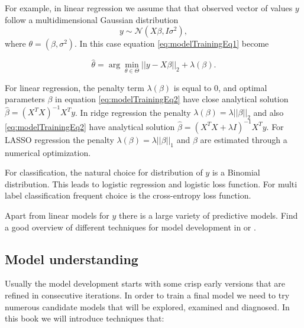 \documentclass[12pt,]{krantz}
\begin{document}
For example, in linear regression we assume that that observed vector of values \(y\) follow a multidimensional Gaussian distribution
\[
y \sim \mathcal N(X \beta, I\sigma^2),
\]
where \(\theta = (\beta, \sigma^2)\). In this case equation \eqref{eq:modelTrainingEq1} become

\begin{equation}
\hat\theta = \arg \min_{\theta \in \Theta}  ||y - X \beta||_{2} + \lambda(\beta). 
\label{eq:modelTrainingEq2}
\end{equation}

For linear regression, the penalty term \(\lambda(\beta)\) is equal to \(0\), and optimal parameters \(\beta\) in equation \eqref{eq:modelTrainingEq2} have close analytical solution \(\hat \beta = (X^TX)^{-1}X^Ty\). In ridge regression the penalty \(\lambda(\beta) = \lambda ||\beta||_2\) and also \eqref{eq:modelTrainingEq2} have analytical solution \(\hat \beta = (X^TX + \lambda I)^{-1}X^Ty\). For LASSO regression the penalty \(\lambda(\beta) = \lambda ||\beta||_1\) and \(\beta\) are estimated through a numerical optimization.

For classification, the natural choice for distribution of \(y\) is a Binomial distribution. This leads to logistic regression and logistic loss function. For multi label classification frequent choice is the cross-entropy loss function.

Apart from linear models for \(y\) there is a large variety of predictive models. Find a good overview of different techniques for model development in \citep{MASSbook} or \citep{Kuhn2013}.

\hypertarget{model-understanding}{%
\subsection{Model understanding}\label{model-understanding}}

Usually the model development starts with some crisp early versions that are refined in consecutive iterations. In order to train a final model we need to try numerous candidate models that will be explored, examined and diagnosed. In this book we will introduce techniques that:
\end{document}
